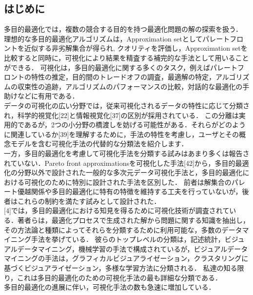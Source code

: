 \documentclass[autodetect-engine,dvipdfmx-if-dvi,ja=standard,a4paper,12pt]{bxjsarticle}
\begin{document}
    \begin{multicols}{2}
      \section{はじめに}
      多目的最適化では，複数の競合する目的を持つ最適化問題の解の探索を扱う．
      理想的な多目的最適化アルゴリズムは，Approximation setとしてパレートフロントを近似する非劣解集合が得られ,
      クオリティを評価し，Approximation setを比較すると同時に，可視化により結果を精査する補完的な手法として用いることができる．
      可視化は，多目的最適化に関する多くのタスク，例えばパレートフロントの特性の推定，目的間のトレードオフの調査，最適解の特定，アルゴリズムの収束性の追跡，アルゴリズムのパフォーマンスの比較，対話的な最適化の手助けなどに有用である．\\
      データの可視化の広い分野では，従来可視化されるデータの特性に応じて分類され，科学的視覚化[22]と情報視覚化[37]の区別が採用されている．
      この分離は実用的であるが，2つの小分野の橋渡しを妨げる可能性がある．それらがどのように関連しているか[39]を理解するために，手法の特性を考慮し，ユーザとその概念モデルを含む可視化手法の代替的な分類法を紹介します．\\
      一方，多目的最適化を考慮して可視化手法を分類する試みはあまり多くは報告されていない．Pareto front approximationsを可視化した手法[42]から，多目的最適化の分野以外で設計された一般的な多次元データ可視化手法と，多目的最適化における可視化のために特別に設計された手法を区別した．
      前者は解集合のパレート優越関係や多目的最適化に特有の特徴を維持する工夫を行っていないが，後者はこれらの制約を満たす試みとして設計された．\\
      {[4]}では，多目的最適化における知見を得るために可視化技術が調査されている．著者らは，最適化プロセスで生成された解から問題に関する知識を抽出し，その方法論と種類によってそれらを分類するために利用可能な，多数のデータマイニング手法を挙げている．
      彼らのトップレベルの分類は，記述統計，ビジュアルデータマイニング，機械学習の手法で構成されているが，ビジュアルデータマイニングの手法は，グラフィカルビジュアライゼーション，クラスタリングに基づくビジュアライゼーション，多様な学習方法に分類される．
      私達の知る限り，これは多目的最適化のための可視化手法の最も詳細な分類である．\\
      多目的最適化の進展に伴い，可視化手法の数も急速に増加している．


\end{multicols}
\end{document}
